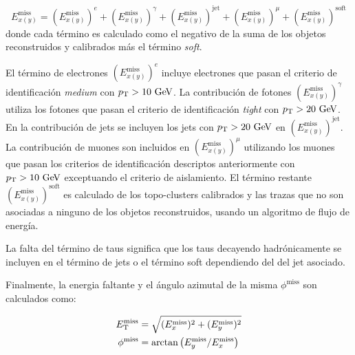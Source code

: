 \begin{equation}
  E^{\mathrm{miss}}_{x(y)} = (E^{\mathrm{miss}}_{x(y)})^e + (E^{\mathrm{miss}}_{x(y)})^\gamma + (E^{\mathrm{miss}}_{x(y)})^{\text{jet}} + (E^{\mathrm{miss}}_{x(y)})^{\mu} + (E^{\mathrm{miss}}_{x(y)})^{\mathrm{soft}}
\end{equation}
%
donde cada término es calculado como el negativo de la suma de los objetos reconstruidos y
calibrados más el término \emph{soft}.

El término de electrones $(E^{\mathrm{miss}}_{x(y)})^e$ incluye electrones que
pasan el criterio de identificación \emph{medium} con $\pt>10\gev$. La
contribución de fotones $(E^{\mathrm{miss}}_{x(y)})^{\gamma}$ utiliza los
fotones que pasan el criterio de identificación \emph{tight} con $\pt>20\gev$.
En la contribución de jets se incluyen los jets con $\pt>20\gev$ en
$(E^{\mathrm{miss}}_{x(y)})^{\text{jet}}$. La contribución de muones son
incluidos en $(E^{\mathrm{miss}}_{x(y)})^{\mu}$ utilizando los muones que pasan
los criterios de identificación descriptos anteriormente con $\pt>10\gev$
exceptuando el criterio de aislamiento. El término restante
$(E^{\mathrm{miss}}_{x(y)})^{\mathrm{soft}}$ es calculado de los topo-clusters
calibrados y las trazas que no son asociadas a ninguno de los objetos
reconstruidos, usando un algoritmo de flujo de energía.

La falta del término de taus significa que los taus decayendo hadrónicamente se
incluyen en el término de jets o el término soft dependiendo del {\pt} del jet
asociado.

Finalmente, la energia faltante {\met} y el ángulo azimutal de la misma
$\phi^\mathrm{miss}$ son calculados como:

\begin{align}
  E_{\mathrm{T}}^{\mathrm{miss}} &= \sqrt{ (E^{\mathrm{miss}}_x)^2 + (E^{\mathrm{miss}}_y)^2 } \\
  \phi^{\mathrm{miss}} &= \arctan \left( E^{\mathrm{miss}}_y / E^{\mathrm{miss}}_x \right)
\end{align}
